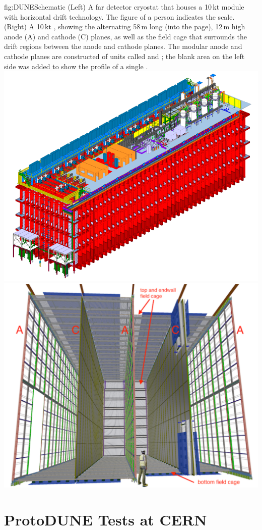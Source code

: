 \documentclass[../main-v1.tex]{subfiles}
\begin{document}
\begin{dunefigure}
{fig:DUNESchematic} %
{(Left) A far detector cryostat that houses a 10\,kt  module with horizontal drift technology. The figure of a person indicates the scale.  (Right) A 10\,kt    , showing the alternating 58\,m long (into the page), 12\,m high anode (A) and cathode (C) planes, as well as the field cage that surrounds the drift regions between the anode and cathode planes. The modular anode and cathode planes are constructed of units called  and ; the blank area on the left side was added to show the profile of a single .}
\includegraphics[height=0.35\textwidth]{graphics/IntroFigures/Fig_03a_cryostat-scale.png}
\includegraphics[height=0.35\textwidth]{graphics/IntroFigures/Fig_03b_DUNESchematic.pdf}
\end{dunefigure}


\section{ProtoDUNE Tests at CERN  %
}
\end{document}
